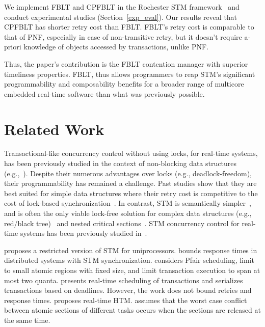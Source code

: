 \documentclass[preprint]{sigplanconf}
\begin{document}
We implement FBLT and CPFBLT in the Rochester STM framework~\cite{marathe2006lowering} and conduct experimental studies (Section~\ref{exp_eval}). Our results reveal that CPFBLT has shorter retry cost than FBLT. FBLT's retry cost is comparable to that of PNF, especially in case of non-transitive retry, but it doesn't require a-priori knowledge of objects accessed by transactions, unlike PNF. 

Thus, the paper's contribution is the FBLT contention manager with superior timeliness properties. FBLT, thus allows programmers to reap STM's significant programmability and composability benefits for a broader range of multicore embedded real-time software than what was previously possible.

\section{Related Work}
\label{sec:past}

Transactional-like concurrency control without using locks, for real-time systems, has been previously studied in the context of non-blocking data structures (e.g.,~\cite{anderson95realtime}). Despite their numerous advantages over locks 
(e.g., deadlock-freedom), their programmability has remained a challenge. Past studies show that they are best suited for simple data structures where their retry cost is competitive to the cost of lock-based synchronization~\cite{bc+08}.  In contrast, STM is semantically simpler~\cite{Herlihy:2006:AMP:1146381.1146382}, and is often the only viable lock-free solution for complex data structures (e.g., red/black tree)~\cite{key-1} and nested critical sections~\cite{Saha:2006:MHP:1122971.1123001}. STM concurrency control for real-time systems has been previously studied in~\cite{manson2006preemptible,fahmy2009bounding,sarni2009real,schoeberl2010rttm,key-1,barrosmanaging,stmconcurrencycontrol:emsoft11,lcmdac2012,pnf_dac_asp,fblt}.

\cite{manson2006preemptible} proposes a restricted version of STM for uniprocessors. \cite{fahmy2009bounding} bounds response times in distributed  systems with STM synchronization. \cite{fahmy2009bounding} considers Pfair scheduling, limit to small atomic regions with fixed size, and limit transaction execution to span at most two quanta. \cite{sarni2009real} presents real-time scheduling of transactions and serializes transactions based on deadlines. However, the work does not bound retries and response times. \cite{schoeberl2010rttm} proposes real-time HTM. \cite{schoeberl2010rttm} assumes that the worst case conflict between atomic sections of different tasks occurs when the sections are released at the same time. 
\end{document}
